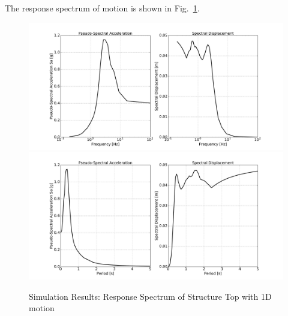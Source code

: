 The response spectrum of motion is shown in Fig.~\ref{fig_spectrum_freq_period_time_series_ssi3d_1D_motion}.
\begin{figure}[H]
  \centering
  \includegraphics[width = 15cm]{./Figure-files/nonlinear_analysis_steps/soil-structure-1D-ans/shell_structure_motion_node_3195_x_spectrum_freq.pdf}
  \includegraphics[width = 15cm]{./Figure-files/nonlinear_analysis_steps/soil-structure-1D-ans/shell_structure_motion_node_3195_x_spectrum_period.pdf}
  \caption{Simulation Results: Response Spectrum of Structure Top with 1D motion}
  \label{fig_spectrum_freq_period_time_series_ssi3d_1D_motion}
\end{figure}


